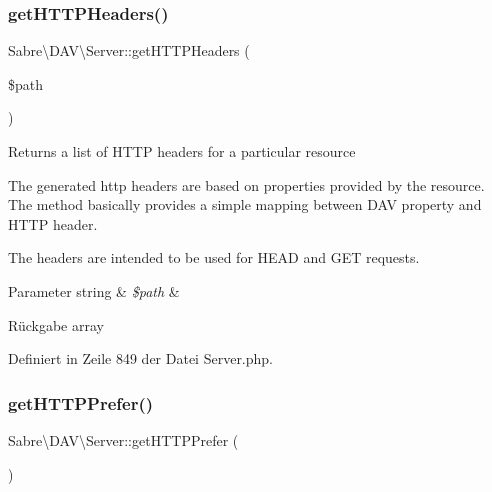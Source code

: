 \mbox{\label{class_sabre_1_1_d_a_v_1_1_server_a9f4cb8d2befd078d02eb1d6b12d92384}} 
\subsubsection{\texorpdfstring{get\+H\+T\+T\+P\+Headers()}{getHTTPHeaders()}}
{\footnotesize\ttfamily Sabre\textbackslash{}\+D\+A\+V\textbackslash{}\+Server\+::get\+H\+T\+T\+P\+Headers (\begin{DoxyParamCaption}\item[{}]{\$path }\end{DoxyParamCaption})}

Returns a list of H\+T\+TP headers for a particular resource

The generated http headers are based on properties provided by the resource. The method basically provides a simple mapping between D\+AV property and H\+T\+TP header.

The headers are intended to be used for H\+E\+AD and G\+ET requests.


\begin{DoxyParams}[1]{Parameter}
string & {\em \$path} & \\
\hline
\end{DoxyParams}
\begin{DoxyReturn}{Rückgabe}
array 
\end{DoxyReturn}


Definiert in Zeile 849 der Datei Server.\+php.

\mbox{\label{class_sabre_1_1_d_a_v_1_1_server_a59300709495a2ec31ddfa88084dd05ef}} 
\subsubsection{\texorpdfstring{get\+H\+T\+T\+P\+Prefer()}{getHTTPPrefer()}}
{\footnotesize\ttfamily Sabre\textbackslash{}\+D\+A\+V\textbackslash{}\+Server\+::get\+H\+T\+T\+P\+Prefer (\begin{DoxyParamCaption}{ }\end{DoxyParamCaption})}

